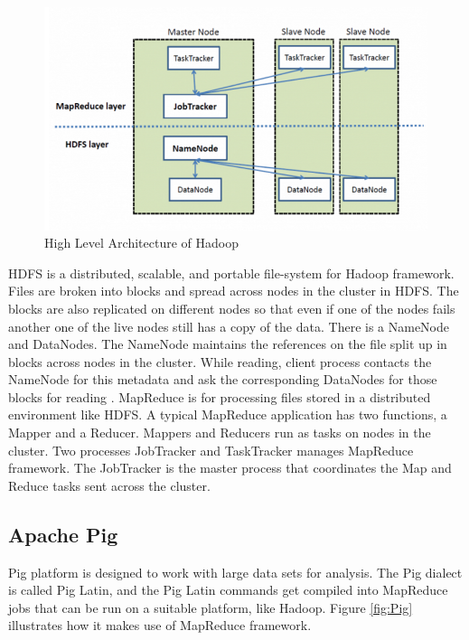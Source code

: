 \documentclass[9pt,twocolumn,twoside]{../../styles/osajnl}
\begin{document}
\begin{figure}[hptb]
\centering
\includegraphics[width=\linewidth]{images/HadoopArch.PNG}
\caption{ High Level Architecture of Hadoop \cite{www-opensource}}
\label{fig:HadoopArchitecture}
\end{figure}

HDFS is a distributed, scalable, and portable file-system for Hadoop framework.
Files are broken into blocks and spread across nodes in the cluster in HDFS. The blocks are also replicated on different nodes so that even if one of the nodes fails another one of the live nodes still has a copy of the data. There is a NameNode and DataNodes. The NameNode maintains the references on the file split up in blocks across nodes in the cluster. While reading, client process contacts the NameNode for this metadata and ask the corresponding DataNodes for those blocks for reading \cite{www-thinkbig}.
MapReduce is for processing files stored in a distributed environment like HDFS. A typical MapReduce application has two functions, a Mapper and a Reducer. Mappers and Reducers run as tasks on nodes in the cluster. Two processes JobTracker and TaskTracker manages MapReduce framework. The JobTracker is the master process that coordinates the Map and Reduce tasks sent across the cluster.

\subsection{Apache Pig}
Pig platform is designed to work with large data sets for analysis. The Pig dialect is called Pig Latin, and the Pig Latin commands get compiled into MapReduce jobs that can be run on a suitable platform, like Hadoop. Figure \ref{fig:Pig} illustrates how it makes use of MapReduce framework.
\end{document}
